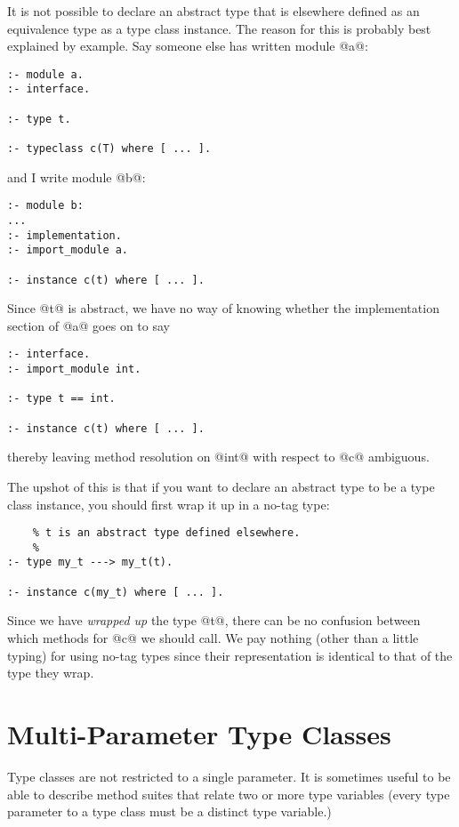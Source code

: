 It is not possible to declare an abstract type that is elsewhere defined
as an equivalence type as a type class instance.  The reason for this is
probably best explained by example.  Say someone else has written module
@a@:
\begin{verbatim}
:- module a.
:- interface.

:- type t.

:- typeclass c(T) where [ ... ].
\end{verbatim}
and I write module @b@:
\begin{verbatim}
:- module b:
...
:- implementation.
:- import_module a.

:- instance c(t) where [ ... ].
\end{verbatim}
Since @t@ is abstract, we have no way of knowing whether the
implementation section of @a@ goes on to say
\begin{verbatim}
:- interface.
:- import_module int.

:- type t == int.

:- instance c(t) where [ ... ].
\end{verbatim}
thereby leaving method resolution on @int@ with respect to @c@
ambiguous.


The upshot of this is that if you want to declare an abstract type to be
a type class instance, you should first wrap it up in a no-tag type:
\begin{verbatim}
    % t is an abstract type defined elsewhere.
    %
:- type my_t ---> my_t(t).

:- instance c(my_t) where [ ... ].
\end{verbatim}
Since we have \emph{wrapped up} the type @t@, there can be no confusion
between which methods for @c@ we should call.  We pay nothing (other
than a little typing) for using no-tag types since their representation
is identical to that of the type they wrap.

\section{Multi-Parameter Type Classes}

Type classes are not restricted to a single parameter.  It is sometimes
useful to be able to describe method suites that relate two or more
type variables (every type parameter to a type class must be a distinct
type variable.)

